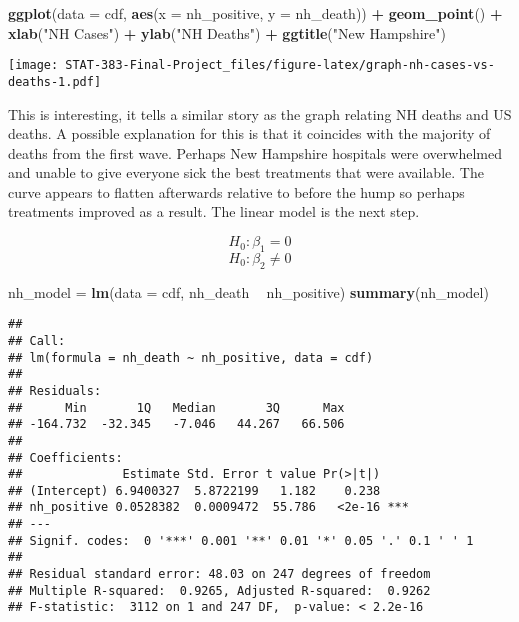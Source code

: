 \documentclass[
]{article}
\newenvironment{Shaded}{\begin{snugshade}}{\end{snugshade}}
\newcommand{\DataTypeTok}[1]{\textcolor[rgb]{0.13,0.29,0.53}{#1}}
\newcommand{\KeywordTok}[1]{\textcolor[rgb]{0.13,0.29,0.53}{\textbf{#1}}}
\newcommand{\NormalTok}[1]{#1}
\newcommand{\OperatorTok}[1]{\textcolor[rgb]{0.81,0.36,0.00}{\textbf{#1}}}
\newcommand{\StringTok}[1]{\textcolor[rgb]{0.31,0.60,0.02}{#1}}
\begin{document}
\begin{Shaded}
\begin{Highlighting}[]
\KeywordTok{ggplot}\NormalTok{(}\DataTypeTok{data =}\NormalTok{ cdf, }\KeywordTok{aes}\NormalTok{(}\DataTypeTok{x =}\NormalTok{ nh_positive, }\DataTypeTok{y =}\NormalTok{ nh_death)) }\OperatorTok{+}\StringTok{ }\KeywordTok{geom_point}\NormalTok{() }\OperatorTok{+}\StringTok{ }\KeywordTok{xlab}\NormalTok{(}\StringTok{"NH Cases"}\NormalTok{) }\OperatorTok{+}\StringTok{ }\KeywordTok{ylab}\NormalTok{(}\StringTok{"NH Deaths"}\NormalTok{) }\OperatorTok{+}\StringTok{ }\KeywordTok{ggtitle}\NormalTok{(}\StringTok{"New Hampshire"}\NormalTok{)}
\end{Highlighting}
\end{Shaded}

\texttt{[image: STAT-383-Final-Project\_files/figure-latex/graph-nh-cases-vs-deaths-1.pdf]}

This is interesting, it tells a similar story as the graph relating NH
deaths and US deaths. A possible explanation for this is that it
coincides with the majority of deaths from the first wave. Perhaps New
Hampshire hospitals were overwhelmed and unable to give everyone sick
the best treatments that were available. The curve appears to flatten
afterwards relative to before the hump so perhaps treatments improved as
a result. The linear model is the next step.

\[H_{0}: \beta_{1} = 0\] \[H_{0}: \beta_{2} \neq 0\]

\begin{Shaded}
\begin{Highlighting}[]
\NormalTok{nh_model =}\StringTok{ }\KeywordTok{lm}\NormalTok{(}\DataTypeTok{data =}\NormalTok{ cdf, nh_death }\OperatorTok{~}\StringTok{ }\NormalTok{nh_positive)}
\KeywordTok{summary}\NormalTok{(nh_model)}
\end{Highlighting}
\end{Shaded}

\begin{verbatim}
## 
## Call:
## lm(formula = nh_death ~ nh_positive, data = cdf)
## 
## Residuals:
##      Min       1Q   Median       3Q      Max 
## -164.732  -32.345   -7.046   44.267   66.506 
## 
## Coefficients:
##              Estimate Std. Error t value Pr(>|t|)    
## (Intercept) 6.9400327  5.8722199   1.182    0.238    
## nh_positive 0.0528382  0.0009472  55.786   <2e-16 ***
## ---
## Signif. codes:  0 '***' 0.001 '**' 0.01 '*' 0.05 '.' 0.1 ' ' 1
## 
## Residual standard error: 48.03 on 247 degrees of freedom
## Multiple R-squared:  0.9265, Adjusted R-squared:  0.9262 
## F-statistic:  3112 on 1 and 247 DF,  p-value: < 2.2e-16
\end{verbatim}
\end{document}
